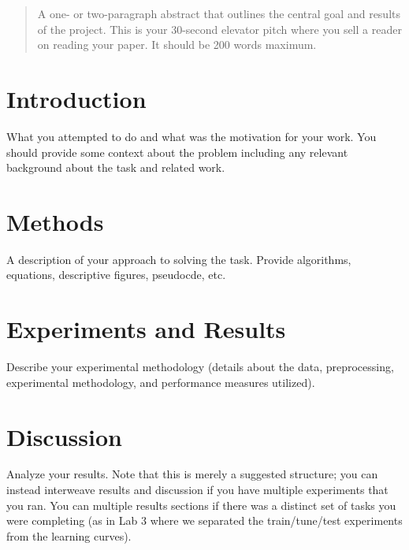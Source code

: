 \documentclass{article}
\begin{document}

\begin{abstract}
A one- or two-paragraph abstract that outlines the central goal and
  results of the project.  This is your 30-second elevator pitch where you
  sell a reader on reading your paper.  It should be 200 words maximum.
\end{abstract}

\section{Introduction}
\label{introduction}

What you attempted to do and what
  was the motivation for your work. You should provide some context about the problem
  including any relevant background about the task and related work.

\section{Methods}
\label{methods}

A description of your approach to solving the task.  Provide algorithms, equations,
descriptive figures, pseudocde, etc.

\section{Experiments and Results}
\label{results}

Describe your experimental methodology (details about the data, preprocessing,
experimental methodology, and performance measures utilized).

\section{Discussion}
\label{discussion}

Analyze your results.  Note that this is merely a suggested structure; you can
instead interweave results and discussion if you have multiple experiments that
you ran.  You can multiple results sections if there was a distinct set of
tasks you were completing (as in Lab 3 where we separated the train/tune/test
experiments from the learning curves).
\end{document}
